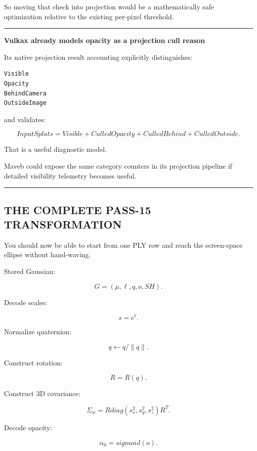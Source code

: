 So moving that check into projection would be a mathematically safe optimization relative to the existing per-pixel threshold.

\begin{center}\rule{0.5\linewidth}{0.5pt}\end{center}

\textbf{Vulkax already models opacity as a projection cull reason}

Its native projection result accounting explicitly distinguishes:

\protect{}\label{qdflga}%
\begin{verbatim}
Visible
Opacity
BehindCamera
OutsideImage
\end{verbatim}

and validates:

\[
InputSplats
=
Visible
+
CulledOpacity
+
CulledBehind
+
CulledOutside.
\]

That is a useful diagnostic model.

Maveb could expose the same category counters in its projection pipeline if detailed visibility telemetry becomes useful.

\begin{center}\rule{0.5\linewidth}{0.5pt}\end{center}

\subsection{THE COMPLETE PASS-15 TRANSFORMATION}\label{04-visual-computing-ii-ch038-the-complete-pass-15-transformation}

You should now be able to start from one PLY row and reach the screen-space ellipse without hand-waving.

Stored Gaussian:

\[
\boxed{
G=
(
\mu,
\ell,
q,
o,
SH
).
}
\]

Decode scales:

\[
\boxed{
s=e^\ell.
}
\]

Normalize quaternion:

\[
\boxed{
q\leftarrow
q/\|q\|.
}
\]

Construct rotation:

\[
R=R(q).
\]

Construct 3D covariance:

\[
\boxed{
\Sigma_w
=
R
diag(s_x^2,s_y^2,s_z^2)
R^T.
}
\]

Decode opacity:

\[
\boxed{
\alpha_0=
sigmoid(o).
}
\]

